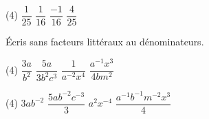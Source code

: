 \documentclass[a4paper, 12pt, parskip=half-, twoside=semi]{scrartcl}
\begin{document}
\begin{solappliquer}
    \begin{tasks}(4)
        \task \(\dfrac{1}{25}\)
        \task \(\dfrac{1}{16}\)
        \task \(\dfrac{-1}{16}\)
        \task \(\dfrac{4}{25}\)
    \end{tasks}
\end{solappliquer}
\begin{appliquer}[points=2]
    Écris sans facteurs littéraux au dénominateurs.
    \begin{tasks}(4)
        \task \(\dfrac{3a}{b^2}\)
        \task \(\dfrac{5a}{3b^2c^3}\)
        \task \(\dfrac{1}{a^{-2}x^4}\)
        \task \(\dfrac{a^{-1}x^3}{4bm^{2}}\)
    \end{tasks}
\end{appliquer}
\begin{solappliquer}
    \begin{tasks}(4)
        \task \(3ab^{-2}\)
        \task \(\dfrac{5ab^{-2}c^{-3}}{3}\)
        \task \(a^2x^{-4}\)
        \task \(\dfrac{a^{-1}b^{-1}m^{-2}x^3}{4}\)
    \end{tasks}
\end{solappliquer}
\end{document}

